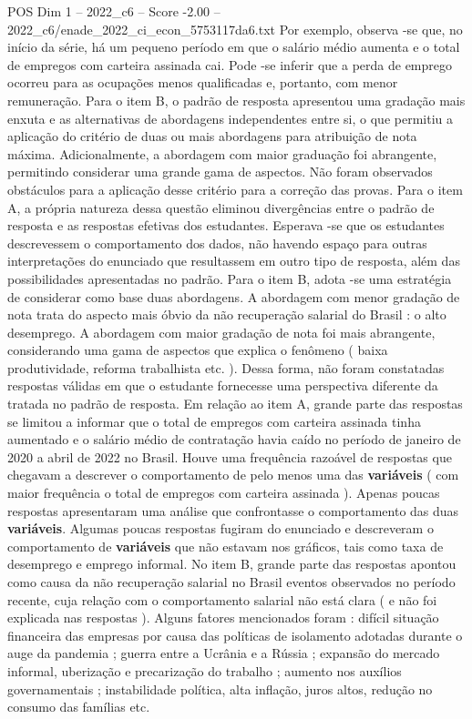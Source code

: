 \begin{textsample}{POS Dim 1 – 2022\_c6 – Score -2.00 – 2022\_c6/enade\_2022\_ci\_econ\_5753117da6.txt}
Por exemplo, observa -se que, no início da série, há um pequeno período em que o salário médio aumenta e o total de empregos com carteira assinada cai.
Pode -se inferir que a perda de emprego ocorreu para as ocupações menos qualificadas e, portanto, com menor remuneração.
Para o item B, o padrão de resposta apresentou uma gradação mais enxuta e as alternativas de abordagens independentes entre si, o que permitiu a aplicação do critério de duas ou mais abordagens para atribuição de nota máxima.
Adicionalmente, a abordagem com maior graduação foi abrangente, permitindo considerar uma grande gama de aspectos.
Não foram observados obstáculos para a aplicação desse critério para a correção das provas.
Para o item A, a própria natureza dessa questão eliminou divergências entre o padrão de resposta e as respostas efetivas dos estudantes.
Esperava -se que os estudantes descrevessem o comportamento dos dados, não havendo espaço para outras interpretações do enunciado que resultassem em outro tipo de resposta, além das possibilidades apresentadas no padrão.
Para o item B, adota -se uma estratégia de considerar como base duas abordagens.
A abordagem com menor gradação de nota trata do aspecto mais óbvio da não recuperação salarial do Brasil : o alto desemprego.
A abordagem com maior gradação de nota foi mais abrangente, considerando uma gama de aspectos que explica o fenômeno ( baixa produtividade, reforma trabalhista etc. ).
Dessa forma, não foram constatadas respostas válidas em que o estudante fornecesse uma perspectiva diferente da tratada no padrão de resposta.
Em relação ao item A, grande parte das respostas se limitou a informar que o total de empregos com carteira assinada tinha aumentado e o salário médio de contratação havia caído no período de janeiro de 2020 a abril de 2022 no Brasil.
Houve uma frequência razoável de respostas que chegavam a descrever o comportamento de pelo menos uma das \textbf{variáveis} ( com maior frequência o total de empregos com carteira assinada ).
Apenas poucas respostas apresentaram uma análise que confrontasse o comportamento das duas \textbf{variáveis}.
Algumas poucas respostas fugiram do enunciado e descreveram o comportamento de \textbf{variáveis} que não estavam nos gráficos, tais como taxa de desemprego e emprego informal.
No item B, grande parte das respostas apontou como causa da não recuperação salarial no Brasil eventos observados no período recente, cuja relação com o comportamento salarial não está clara ( e não foi explicada nas respostas ).
Alguns fatores mencionados foram : difícil situação financeira das empresas por causa das políticas de isolamento adotadas durante o auge da pandemia ; guerra entre a Ucrânia e a Rússia ; expansão do mercado informal, uberização e precarização do trabalho ; aumento nos auxílios governamentais ; instabilidade política, alta inflação, juros altos, redução no consumo das famílias etc.

\end{textsample}
